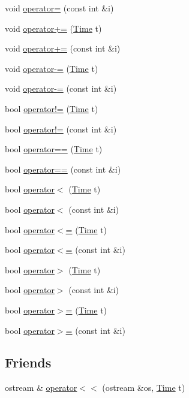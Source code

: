 \begin{DoxyCompactItemize}
\item 
void \hyperlink{classTime_a137e4e36bc5efd8838fe2f4770c30356}{operator=} (const int \&i)
\item 
void \hyperlink{classTime_a4a34f39b8a00ec43aa8533f2e1352575}{operator+=} (\hyperlink{classTime}{Time} t)
\item 
void \hyperlink{classTime_a36e9f87fed3b1f5b012f0d17890a47f5}{operator+=} (const int \&i)
\item 
void \hyperlink{classTime_a8f13a4bae10b2b177e9196cc5dfebaef}{operator-\/=} (\hyperlink{classTime}{Time} t)
\item 
void \hyperlink{classTime_a93b36c8ccc48b37f93b4329c2ec81263}{operator-\/=} (const int \&i)
\item 
bool \hyperlink{classTime_adeadda22a4389d28c9cd47e771140947}{operator!=} (\hyperlink{classTime}{Time} t)
\item 
bool \hyperlink{classTime_ae57932e9959b4ff4d788c6a4f5b7a8c3}{operator!=} (const int \&i)
\item 
bool \hyperlink{classTime_a450f2572a6ffce86bedf20cd3e30dea1}{operator==} (\hyperlink{classTime}{Time} t)
\item 
bool \hyperlink{classTime_a691c63a1b034b94b3372a296b5aa9297}{operator==} (const int \&i)
\item 
bool \hyperlink{classTime_a299ba752581f8c7098ea5f0099a562dd}{operator$<$} (\hyperlink{classTime}{Time} t)
\item 
bool \hyperlink{classTime_aca56999d192f7275158d97af1deabec6}{operator$<$} (const int \&i)
\item 
bool \hyperlink{classTime_a7a117d0c33441bdfcd0463c5840be975}{operator$<$=} (\hyperlink{classTime}{Time} t)
\item 
bool \hyperlink{classTime_a66095afebb732ea8e9c58021884c1673}{operator$<$=} (const int \&i)
\item 
bool \hyperlink{classTime_a7b8dd29e79ec8b46ecb250603b692a7c}{operator$>$} (\hyperlink{classTime}{Time} t)
\item 
bool \hyperlink{classTime_a4edfcb08ef029a7666d3cc23af8210fb}{operator$>$} (const int \&i)
\item 
bool \hyperlink{classTime_aeaeb86c12138eb081459de197d1726e4}{operator$>$=} (\hyperlink{classTime}{Time} t)
\item 
bool \hyperlink{classTime_ada3c97b486231e276598fc7efbc0d6cc}{operator$>$=} (const int \&i)
\end{DoxyCompactItemize}
\subsection*{Friends}
\begin{DoxyCompactItemize}
\item 
ostream \& \hyperlink{classTime_a17d812d03b85ce4b342d904271798fc8}{operator$<$$<$} (ostream \&os, \hyperlink{classTime}{Time} t)
\end{DoxyCompactItemize}


